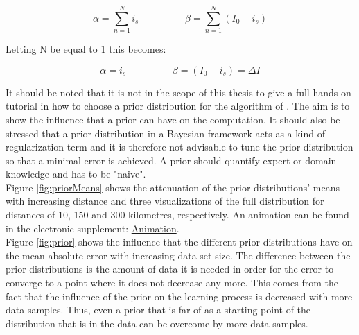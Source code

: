 \begin{equation}
\alpha = \sum^N_{n= 1} i_s \hspace{2cm} \beta = \sum^N_{n= 1} (I_0 - i_s)
\label{eqn:updatehyperPrior}
\end{equation}

Letting N be equal to 1 this becomes:

\begin{equation}
\alpha = i_s \hspace{2cm} \beta = (I_0 - i_s) = \Delta I
\label{eqn:updatehyperPrior}
\end{equation}

It should be noted that it is not in the scope of this thesis to give a full hands-on tutorial in how to choose a prior distribution for the algorithm of \cite{Rotondi2004}. The aim is to show the influence that a prior can have on the computation. It should also be stressed that a prior distribution in a Bayesian framework acts as a kind of regularization term and it is therefore not advisable to tune the prior distribution so that a minimal error is achieved. A prior should quantify expert or domain knowledge and has to be "naive". \\
Figure \ref{fig:priorMeans} shows the attenuation of the prior distributions' means with increasing distance and three visualizations of the full distribution for distances of 10, 150 and 300 kilometres, respectively. An animation can be found in the electronic supplement: \href{https://github.com/silvioschwarz/master-thesis/tree/master/Masterarbeit/gif/plot.gif}{Animation}.\\
Figure \ref{fig:prior} shows the influence that the different prior distributions have on the mean absolute error with increasing data set size. The difference between the prior distributions is the amount of data it is needed in order for the error to converge to a point where it does not decrease any more. This comes from the fact that the influence of the prior on the learning process is decreased with more data samples. Thus, even a prior that is far of as a starting point of the distribution that is in the data can be overcome by more data samples.

